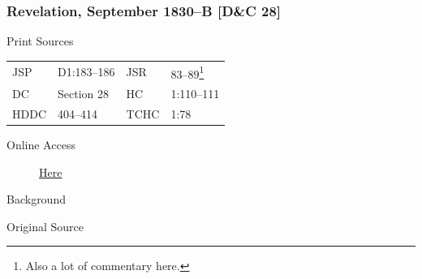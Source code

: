 		\subsubsection{Revelation, September 1830--B [D\&C 28]}
			\label{EMS-1830-JS-SEP-1830-B}
		
			\begin{description}
				\item[Print Sources]
			\end{description}

				\begin{tabular}{p{0.5in}p{1in}p{0.5in}p{1in}}
				JSP	 	& D1:183--186	& JSR 		& 83--89\footnote{Also a lot of commentary here.} \\
				DC	 	& Section 28	& HC 		& 1:110--111 \\
				HDDC 	& 404--414		& TCHC 		& 1:78 \\
				\end{tabular}
			
			\begin{description}
				\item[Online Access] \href{https://www.josephsmithpapers.org/paper-summary/revelation-september-1830-b-dc-28/1}{Here}
			\end{description}
			
			\begin{description}
				\item[Background]
			\end{description}
			
			
			\begin{description}
				\item[Original Source]
			\end{description}
			
			
